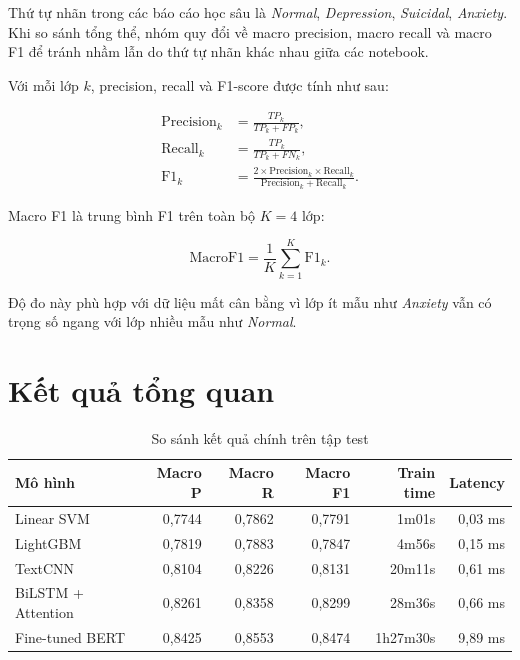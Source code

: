 \documentclass[12pt,a4paper,oneside]{report}
\newlength{\manualparindent}
\newcommand{\manualindent}{\hspace*{\manualparindent}}
\begin{document}
\manualindent%
Thứ tự nhãn trong các báo cáo học sâu là \textit{Normal}, \textit{Depression}, \textit{Suicidal}, \textit{Anxiety}. Khi so sánh tổng thể, nhóm quy đổi về macro precision, macro recall và macro F1 để tránh nhầm lẫn do thứ tự nhãn khác nhau giữa các notebook.

\manualindent%
Với mỗi lớp $k$, precision, recall và F1-score được tính như sau:

\begin{align}
  \mathrm{Precision}_k &= \frac{TP_k}{TP_k + FP_k}, \\
  \mathrm{Recall}_k &= \frac{TP_k}{TP_k + FN_k}, \\
  \mathrm{F1}_k &= \frac{2 \times \mathrm{Precision}_k \times \mathrm{Recall}_k}
  {\mathrm{Precision}_k + \mathrm{Recall}_k}.
  \label{eq:precision-recall-f1}
\end{align}

Macro F1 là trung bình F1 trên toàn bộ $K=4$ lớp:

\begin{equation}
  \mathrm{MacroF1} = \frac{1}{K}\sum_{k=1}^{K}\mathrm{F1}_k.
  \label{eq:macro-f1}
\end{equation}

Độ đo này phù hợp với dữ liệu mất cân bằng vì lớp ít mẫu như \textit{Anxiety} vẫn có trọng số ngang với lớp nhiều mẫu như \textit{Normal}.

\section{Kết quả tổng quan}

\begin{table}[H]
  \centering
  \caption{So sánh kết quả chính trên tập test}
  \label{tab:model-main-results}
  \small
  \begin{tabular}{lrrrrr}
    \toprule
    Mô hình & Macro P & Macro R & Macro F1 & Train time & Latency \\
    \midrule
    Linear SVM & 0,7744 & 0,7862 & 0,7791 & 1m01s & 0,03 ms \\
    LightGBM & 0,7819 & 0,7883 & 0,7847 & 4m56s & 0,15 ms \\
    TextCNN & 0,8104 & 0,8226 & 0,8131 & 20m11s & 0,61 ms \\
    BiLSTM + Attention & 0,8261 & 0,8358 & 0,8299 & 28m36s & 0,66 ms \\
    Fine-tuned BERT & 0,8425 & 0,8553 & 0,8474 & 1h27m30s & 9,89 ms \\
    \bottomrule
  \end{tabular}
\end{table}
\end{document}
